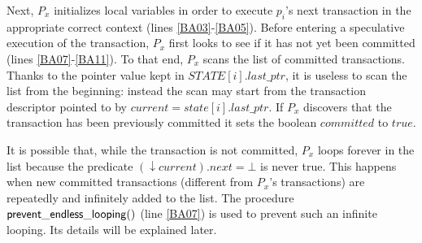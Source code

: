 Next, $P_x$  initializes local  variables in order  to execute  $p_i$'s next
transaction in the appropriate correct context (lines \ref{BA03}-\ref{BA05}).
Before entering a speculative  execution of the transaction, 
$P_x$ first looks to see
if it has not yet been committed (lines  \ref{BA07}-\ref{BA11}). To that
end,  $P_x$  scans  the list   of  committed transactions.   Thanks to  the
pointer value kept in  $\mathit{STATE}[i].last\_ptr$, it is useless to
scan the list from the beginning:  
instead the scan may start from the transaction 
descriptor pointed to by $current = state[i].last\_ptr$. 
If $P_x$  discovers that the  transaction has been previously  committed it
sets the boolean $committed$ to $\mathit{true}$. 

It is  possible that, while the  transaction is not  committed, $P_x$ loops
forever in the list because the predicate $(\downarrow current).next=\bot$ 
is  never true. This  happens  when  new committed  transactions (different
from $P_x$'s transactions) are repeatedly and infinitely 
added to the list. The procedure  ${\sf prevent\_endless\_looping}()$
(line \ref{BA07}) is used to prevent such an infinite looping. 
Its details will be  explained  later. 



